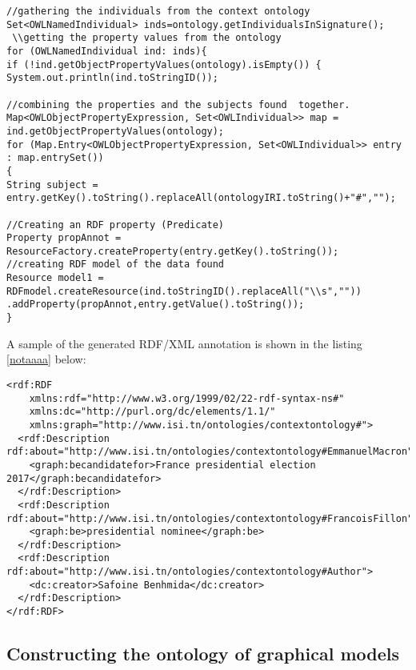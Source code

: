 \begin{lstlisting}[captionpos=b, caption=Annotation generation definition in Java, label={annot},
basicstyle=\footnotesize,frame=single]
//gathering the individuals from the context ontology
Set<OWLNamedIndividual> inds=ontology.getIndividualsInSignature();
 \\getting the property values from the ontology
for (OWLNamedIndividual ind: inds){
if (!ind.getObjectPropertyValues(ontology).isEmpty()) {
System.out.println(ind.toStringID());

//combining the properties and the subjects found  together.
Map<OWLObjectPropertyExpression, Set<OWLIndividual>> map = ind.getObjectPropertyValues(ontology);
for (Map.Entry<OWLObjectPropertyExpression, Set<OWLIndividual>> entry : map.entrySet())
{
String subject = entry.getKey().toString().replaceAll(ontologyIRI.toString()+"#","");

//Creating an RDF property (Predicate)
Property propAnnot = ResourceFactory.createProperty(entry.getKey().toString());
//creating RDF model of the data found
Resource model1 = RDFmodel.createResource(ind.toStringID().replaceAll("\\s",""))
.addProperty(propAnnot,entry.getValue().toString());
}     
\end{lstlisting}
A sample of the generated RDF/XML annotation is shown in the listing \ref{notaaaa} below:

\begin{lstlisting}[captionpos=b, caption=RDF sample of the generated Annotation, label={notaaaa},
basicstyle=\footnotesize,frame=single]
<rdf:RDF
    xmlns:rdf="http://www.w3.org/1999/02/22-rdf-syntax-ns#"
    xmlns:dc="http://purl.org/dc/elements/1.1/"
    xmlns:graph="http://www.isi.tn/ontologies/contextontology#">
  <rdf:Description rdf:about="http://www.isi.tn/ontologies/contextontology#EmmanuelMacron">
    <graph:becandidatefor>France presidential election 2017</graph:becandidatefor>
  </rdf:Description>
  <rdf:Description rdf:about="http://www.isi.tn/ontologies/contextontology#FrancoisFillon">
    <graph:be>presidential nominee</graph:be>
  </rdf:Description>
  <rdf:Description rdf:about="http://www.isi.tn/ontologies/contextontology#Author">
    <dc:creator>Safoine Benhmida</dc:creator>
  </rdf:Description>
</rdf:RDF>    
\end{lstlisting}

\subsection{Constructing the ontology of graphical models}


